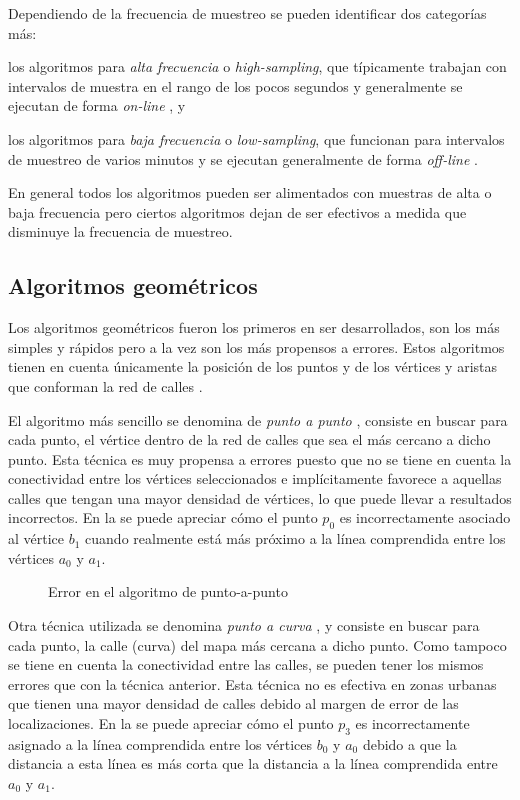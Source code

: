Dependiendo de la frecuencia de muestreo se pueden identificar dos categorías más: \begin{enumerate*}[1)] \item los algoritmos para \emph{alta frecuencia} o \emph{high-sampling}, que típicamente trabajan con intervalos de muestra en el rango de los pocos segundos y generalmente se ejecutan de forma \emph{on-line} \citep{greenfeld2002matching,quddus2003general,quddus2006high}, y \item los algoritmos para \emph{baja frecuencia} o \emph{low-sampling},  que funcionan para intervalos de muestreo de varios minutos y se ejecutan generalmente de forma \emph{off-line} \citep{lou2009map,yuan2010interactive}. \end{enumerate*} En general todos los algoritmos pueden ser alimentados con muestras de alta o baja frecuencia pero ciertos algoritmos dejan de ser efectivos a medida que disminuye la frecuencia de muestreo.

\subsection{Algoritmos geométricos}

Los algoritmos geométricos fueron los primeros en ser desarrollados, son los más simples y rápidos pero a la vez son los más propensos a errores. Estos algoritmos tienen en cuenta únicamente la posición de los puntos y de los vértices y aristas que conforman la red de calles \citep{quddus2007current}.

El algoritmo más sencillo se denomina de \emph{punto a punto} \citep{white2000some}, consiste en buscar para cada punto, el vértice dentro de la red de calles que sea el más cercano a dicho punto. Esta técnica es muy propensa a errores puesto que no se tiene en cuenta la conectividad entre los vértices seleccionados e implícitamente favorece a aquellas calles que tengan una mayor densidad de vértices, lo que puede llevar a resultados incorrectos. En la  se puede apreciar cómo el punto $p_0$ es incorrectamente asociado al vértice $b_1$ cuando realmente está más próximo a la línea comprendida entre los vértices $a_0$ y $a_1$.

\begin{figure}[h]
	\centering
	
	\caption{Error en el algoritmo de punto-a-punto}
	\label{fig:punto-a-punto} 
\end{figure}

Otra técnica utilizada se denomina \emph{punto a curva} \citep{white2000some}, y consiste en buscar para cada punto, la calle (curva) del mapa más cercana a dicho punto. Como tampoco se tiene en cuenta la conectividad entre las calles, se pueden tener los mismos errores que con la técnica anterior. Esta técnica no es efectiva en zonas urbanas que tienen una mayor densidad de calles debido al margen de error de las localizaciones. En la  se puede apreciar cómo el punto $p_3$ es incorrectamente asignado a la línea comprendida entre los vértices $b_0$ y $a_0$ debido a que la distancia a esta línea es más corta que la distancia a la línea comprendida entre $a_0$ y $a_1$.

